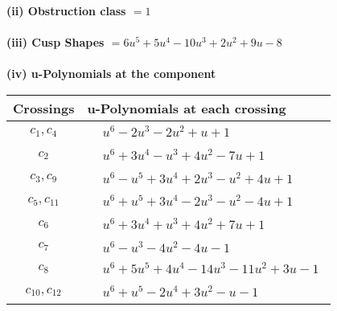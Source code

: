 \documentclass[1p]{elsarticle_modified}
\theoremstyle{definition}
\begin{document}
\flushleft \textbf{(ii) Obstruction class $= 1$}\\~\\
\flushleft \textbf{(iii) Cusp Shapes $= 6 u^5+5 u^4-10 u^3+2 u^2+9 u-8$}\\~\\
\newpage\renewcommand{\arraystretch}{1}
\flushleft \textbf{(iv) u-Polynomials at the component}\newline \\
\begin{tabular}{m{50pt}|m{274pt}}
Crossings & \hspace{64pt}u-Polynomials at each crossing \\
\hline $$\begin{aligned}c_{1},c_{4}\end{aligned}$$&$\begin{aligned}
&u^6-2 u^3-2 u^2+u+1
\end{aligned}$\\
\hline $$\begin{aligned}c_{2}\end{aligned}$$&$\begin{aligned}
&u^6+3 u^4- u^3+4 u^2-7 u+1
\end{aligned}$\\
\hline $$\begin{aligned}c_{3},c_{9}\end{aligned}$$&$\begin{aligned}
&u^6- u^5+3 u^4+2 u^3- u^2+4 u+1
\end{aligned}$\\
\hline $$\begin{aligned}c_{5},c_{11}\end{aligned}$$&$\begin{aligned}
&u^6+u^5+3 u^4-2 u^3- u^2-4 u+1
\end{aligned}$\\
\hline $$\begin{aligned}c_{6}\end{aligned}$$&$\begin{aligned}
&u^6+3 u^4+u^3+4 u^2+7 u+1
\end{aligned}$\\
\hline $$\begin{aligned}c_{7}\end{aligned}$$&$\begin{aligned}
&u^6- u^3-4 u^2-4 u-1
\end{aligned}$\\
\hline $$\begin{aligned}c_{8}\end{aligned}$$&$\begin{aligned}
&u^6+5 u^5+4 u^4-14 u^3-11 u^2+3 u-1
\end{aligned}$\\
\hline $$\begin{aligned}c_{10},c_{12}\end{aligned}$$&$\begin{aligned}
&u^6+u^5-2 u^4+3 u^2- u-1
\end{aligned}$\\
\hline
\end{tabular}\\~\\
\end{document}
